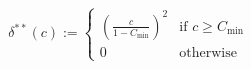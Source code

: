 \begin{equation}
	\delta^{**}(c) := 
	\begin{cases} 
		\left(\frac{c}{1-C_\text{min}}\right)^2 & \text{if } c \geq C_\text{min} \\
		0 & \text{otherwise}
	\end{cases}
	\label{ch4:equ:metric-utilisation-scaling}
\end{equation}
